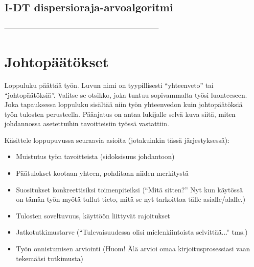  
\subsection{I-DT dispersioraja-arvoalgoritmi}
 

\label{sec:esimluku}

 --------------------------------------------------------------------

\section{Johtopäätökset}

Loppuluku päättää työn. Luvun nimi on tyypillisesti ``yhteenveto'' tai
``johtopäätöksiä''. Valitse se otsikko, joka tuntuu sopivammalta työsi
luonteeseen. Joka tapauksessa loppuluku sisältää niin työn yhteenvedon
kuin johtopäätöksiä työn tulosten perusteella. Pääajatus on antaa
lukijalle selvä kuva siitä, miten johdannossa asetettuihin
tavoitteisiin työssä vastattiin.

Käsittele loppupuvussa seuraavia asioita (jotakuinkin tässä järjestyksessä):
%
\begin{itemize}
  \item Muistutus työn tavoitteista (sidoksisuus johdantoon)
  \item Päätulokset kootaan yhteen, pohditaan niiden merkitystä
  \item Suositukset konkreettisiksi toimenpiteiksi (``Mitä sitten?'' 
Nyt kun käytössä on tämän työn myötä tullut tieto, 
mitä se nyt tarkoittaa tälle asialle/alalle.)
  \item Tulosten soveltuvuus, käyttöön liittyvät rajoitukset
  \item Jatkotutkimustarve 
(``Tulevaisuudessa olisi mielenkiintoista selvittää...'' tms.)
  \item Työn onnistumisen arviointi 
(Huom! Älä arvioi omaa kirjoitusprosessiasi vaan tekemääsi tutkimusta)
\end{itemize}


